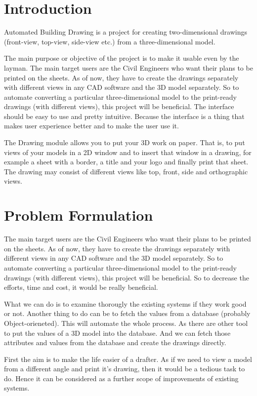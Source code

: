 \section{Introduction}
Automated Building Drawing is a project for creating two-dimensional drawings (front-view, top-view, side-view etc.) from a three-dimensional model.

The main purpose or objective of the project is to make it usable even by the layman. The main target users are the Civil Engineers who want their plans to be printed on the sheets. As of now, they have to create the drawings separately with different views in any CAD software and the 3D model separately. So to automate converting a particular three-dimensional model to the print-ready drawings (with different views), this project will be beneficial. The interface should be easy to use and pretty intuitive. Because the interface is a thing that makes user experience better and to make the user use it.

The Drawing module allows you to put your 3D work on paper. That is, to put views of your models in a 2D window and to insert that window in a drawing, for example a sheet with a border, a title and your logo and finally print that sheet. The drawing may consist of different views like top, front, side and orthographic views.

\section{Problem Formulation}

The main target users are the Civil Engineers who want their plans to be printed on the sheets. As of now, they have to create the drawings separately with different views in any CAD software and the 3D model separately. So to automate converting a particular three-dimensional model to the print-ready drawings (with different views), this project will be beneficial. So to decrease the efforts, time and cost, it would be really beneficial.

What we can do is to examine thorougly the existing systems if they work good or not. Another thing to do can be to fetch the values from a database (probably Object-orieneted). This will automate the whole process. As there are other tool to put the values of a 3D model into the database. And we can fetch those attributes and values from the database and create the drawings directly. 

First the aim is to make the life easier of a drafter. As if we need to view a model from a different angle and print it's drawing, then it would be a tedious task to do. Hence it can be considered as a further scope of improvements of existing systems.

